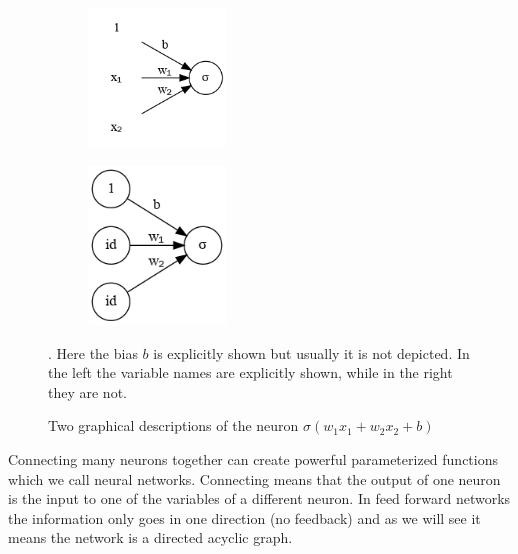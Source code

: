 \documentclass[11pt, a4paper]{report}
\theoremstyle{plain}
\theoremstyle{definition}
\theoremstyle{remark}
\begin{document}
\begin{figure}[!h]
\begin{framed}
\centering
\begin{subfigure}[b]{0.45\textwidth}
\includegraphics[width=0.4\textwidth]{./plots/neuron.gv.png}
\end{subfigure}
\begin{subfigure}[b]{0.45\textwidth}
\includegraphics[width=0.4\textwidth]{./plots/neuron.2.gv.png}
\end{subfigure}
\caption{Two graphical descriptions of the neuron
$\sigma(w_1x_1 + w_2x_2 + b)$}. Here the bias $b$ is explicitly shown
but usually it is not depicted. In the left the variable names are explicitly
shown, while in the right they are not.
\label{fig:neuron2}
\end{framed}
\end{figure}

Connecting many neurons together can create powerful parameterized
functions which we call neural networks.
Connecting means that the output of one neuron is the input to one of the
variables of a different neuron.
In feed forward networks the information only goes in one direction (no
feedback) and as we will see it means the network is a directed acyclic graph.
\end{document}
